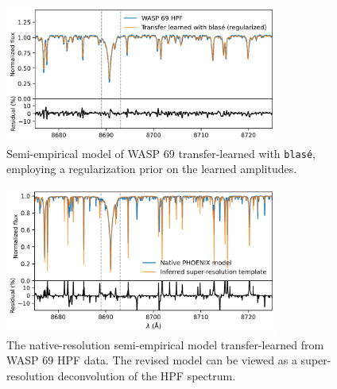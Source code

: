 \documentclass[modern]{aastex631}
\begin{document}
\begin{figure}[hbt!]
    \centering
    \includegraphics[width=0.8\textwidth]{figures/blase_WASP69_regularized.png}
    \caption{Semi-empirical model of WASP 69 transfer-learned with \texttt{blas\'e}, employing a regularization prior on the learned amplitudes.}
    \label{fig_WASP69_transferred}
\end{figure}

\begin{figure}[hbt!]
    \centering
    \includegraphics[width=0.8\textwidth]{figures/blase_super_resolution_template.png}
    \caption{The native-resolution semi-empirical model transfer-learned from WASP 69 HPF data. The revised model can be viewed as a super-resolution deconvolution of the HPF spectrum.}
    \label{fig_WASP69_regularized}
\end{figure}


\end{document}
